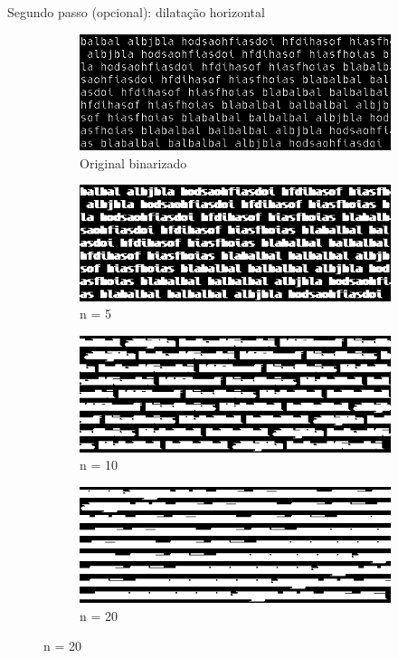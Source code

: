 \documentclass{beamer}
\begin{document}
\begin{frame}{Segundo passo (opcional): dilatação horizontal}

\begin{figure}
    \centering
    \begin{subfigure}[]{0.49\textwidth}
        \centering
        \includegraphics[width=\textwidth]{images/terminal_bin.png}
        \caption{Original binarizado}
    \end{subfigure}
    \begin{subfigure}[]{0.49\textwidth}
        \centering
        \includegraphics[width=\textwidth]{images/terminal_dilated_5.png}
        \caption{n = 5}
    \end{subfigure}
    \begin{subfigure}[]{0.49\textwidth}
        \centering
        \includegraphics[width=\textwidth]{images/terminal_dilated_10.png}
        \caption{n = 10}
    \end{subfigure}
    \begin{subfigure}[]{0.49\textwidth}
        \centering
        \includegraphics[width=\textwidth]{images/terminal_dilated_20.png}
        \caption{n = 20}
    \end{subfigure}
\end{figure}


\end{frame}
\end{document}
